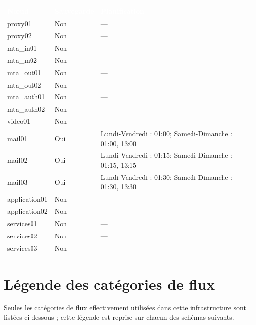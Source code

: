 \documentclass[11pt,a4paper]{report}
\newcommand{\tblhead}[1]{\textcolor{white}{\textbf{#1}}}
\begin{document}
\begin{longtable}{|p{3.2cm}|p{2.4cm}|p{7.6cm}|}
\hline
\rowcolor{primary}\tblhead{Nœud} & \tblhead{Sauvegarde} & \tblhead{Planification} \\
\hline
\endhead
proxy01 & Non & --- \\
\hline
proxy02 & Non & --- \\
\hline
mta\_in01 & Non & --- \\
\hline
mta\_in02 & Non & --- \\
\hline
mta\_out01 & Non & --- \\
\hline
mta\_out02 & Non & --- \\
\hline
mta\_auth01 & Non & --- \\
\hline
mta\_auth02 & Non & --- \\
\hline
video01 & Non & --- \\
\hline
mail01 & Oui & Lundi-\allowbreak{}Vendredi : 01:00; Samedi-\allowbreak{}Dimanche : 01:00, 13:00 \\
\hline
mail02 & Oui & Lundi-\allowbreak{}Vendredi : 01:15; Samedi-\allowbreak{}Dimanche : 01:15, 13:15 \\
\hline
mail03 & Oui & Lundi-\allowbreak{}Vendredi : 01:30; Samedi-\allowbreak{}Dimanche : 01:30, 13:30 \\
\hline
application01 & Non & --- \\
\hline
application02 & Non & --- \\
\hline
services01 & Non & --- \\
\hline
services02 & Non & --- \\
\hline
services03 & Non & --- \\
\hline
\end{longtable}

\section{Légende des catégories de flux}
Seules les catégories de flux effectivement utilisées dans cette infrastructure sont listées ci-dessous ; cette légende est reprise sur chacun des schémas suivants.

\end{document}
